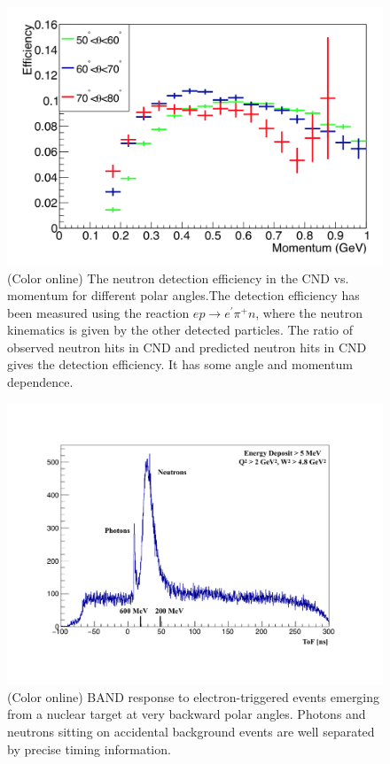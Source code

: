 \documentclass[final,3p,twocolumn]{elsarticle}
\begin{document}
\begin{figure}[th!]
\centerline{\includegraphics[width=1.0\columnwidth]{cnd-neutron-efficiency.png}}
\caption{(Color online) The neutron detection efficiency in the CND vs. momentum for different polar angles.The  detection efficiency 
has been measured using the reaction $e p \to e^\prime \pi^+ n$, where the neutron kinematics is given by the other 
detected particles. The ratio of observed neutron hits in CND and predicted neutron hits in CND gives the detection efficiency. It 
has some angle and momentum dependence.  } 
\label{CND-neutron-efficiency}
\end{figure} 

\begin{figure}[th!]
\centerline{\includegraphics[width=1.2\columnwidth]{BAND-performance.pdf}}
\caption{(Color online) BAND response to electron-triggered events emerging from a nuclear target at 
very backward polar angles. Photons and neutrons sitting on accidental background events are well 
separated by precise timing information. } 
\label{BAND-performance}
\end{figure} 
\end{document}
